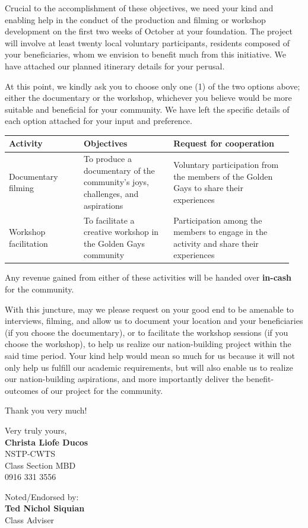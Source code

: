 \documentclass[12pt,a4paper]{letter}
\begin{document}
Crucial to the accomplishment of these objectives, we need your kind and enabling 
help in the conduct of the production and filming or workshop development on the 
first two weeks of October at your foundation. The project will involve at least twenty local voluntary
participants, residents composed of your beneficiaries, whom we envision to benefit
much from this initiative. We have attached our planned itinerary details for your
perusal.

At this point, we kindly ask you to choose only one (1) of the two options above;
either the documentary or the workshop, whichever you believe would be more suitable
and beneficial for your community. We have left the specific details of each option
attached for your input and preference.
\newpage
\begin{center}
\begin{tabular}{@{} p{0.25\linewidth} p{0.30\linewidth} p{0.40\linewidth} @{}}
    \toprule
    Activity & Objectives & Request for cooperation \\
    \midrule
    Documentary filming &
    To produce a documentary of the community’s joys, challenges, and aspirations &
	Voluntary participation from the members of the Golden Gays to share their experiences \\[4pt]
    Workshop facilitation &
    To facilitate a creative workshop in the Golden Gays community &
	Participation among the members to engage in the activity and share their experiences \\[4pt]
    \bottomrule
\end{tabular}
\end{center}
	
Any revenue gained from either of these activities will be handed over \textbf{in-cash} for the community.

With this juncture, may we please request on your good end to be amenable to
interviews, filming, and allow us to document your location and your beneficiaries
(if you choose the documentary), or to facilitate the workshop sessions (if you choose
the workshop), to help us realize our nation-building project within the said time
period. Your kind help would mean so much for us because it will not only help us
fulfill our academic requirements, but will also enable us to realize our
nation-building aspirations, and more importantly deliver the benefit-outcomes of
our project for the community.

Thank you very much!

\begin{flushleft}
Very truly yours, \\[3em]
\textbf{Christa Liofe Ducos} \\
NSTP-CWTS \\
Class Section MBD \\
0916 331 3556
\end{flushleft}


\begin{flushright}
Noted/Endorsed by: \\[3em]
\textbf{Ted Nichol Siquian} \\
Class Adviser
\end{flushright}
\end{document}
